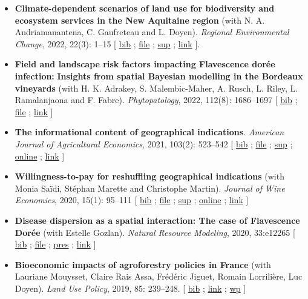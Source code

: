 \documentclass[11pt, a4paper]{./style}
\begin{document}
\begin{itemize}
\item \textbf{Climate-dependent scenarios of land use for biodiversity and
ecosystem services in the New Aquitaine region} (with
N. A. Andriamanantena, C. Gaufreteau and L. Doyen). \emph{Regional
Environmental Change}, 2022, 22(3): 1--15 [ \href{bib/MDFD.bib}{bib} ; \href{doc/CDSA-FILE.pdf}{file} ; \href{doc/CDSA-SUP.pdf}{sup} ;
\href{https://link.springer.com/article/10.1007/s10113-022-01964-6}{link} ].
\item \textbf{Field and landscape risk factors impacting Flavescence dorée
infection:} \textbf{Insights from spatial Bayesian modelling in the
Bordeaux vineyards} (with H. K. Adrakey, S. Malembic-Maher,
A. Rusch, L. Riley, L. Ramalanjaona and
F. Fabre). \emph{Phytopatology}, 2022, 112(8): 1686--1697 [ \href{bib/MDFD.bib}{bib} ; \href{doc/MDFD-FILE.pdf}{file}
; \href{https://apsjournals.apsnet.org/doi/10.1094/PHYTO-10-21-0449-R}{link} ]
\item \textbf{The informational content of geographical
indications}. \emph{American Journal of Agricultural Economics}, 2021,
103(2): 523--542 [ \href{bib/GEOIND.bib}{bib} ; \href{doc/GEOIND-FILE.pdf}{file} ; \href{doc/GEOIND-SUP.pdf}{sup} ; \href{https://github.com/jsay/geoInd/}{online} ; \href{https://onlinelibrary.wiley.com/doi/full/10.1111/ajae.12100}{link} ]
\item \textbf{Willingness-to-pay for reshuffling geographical indications}
(with Monia Saïdi, Stéphan Marette and Christophe
Martin). \emph{Journal of Wine Economics}, 2020, 15(1): 95--111 [ \href{bib/RFGI.bib}{bib}
; \href{doc/RFGI-FILE.pdf}{file} ; \href{doc/RFGI-SUP.pdf}{sup} ; \href{https://github.com/jsay/reshufGI/}{online} ; \href{https://www.cambridge.org/core/journals/journal-of-wine-economics/article/abs/willingnesstopay-for-reshuffling-geographical-indications/FD4DB1BCA54C1E204773BF861965BEBD}{link} ]
\item \textbf{Disease dispersion as a spatial interaction: The case of
Flavescence Dorée} (with Estelle Gozlan). \emph{Natural Resource
Modeling}, 2020, 33:e12265 [ \href{bib/SPFD.bib}{bib} ; \href{doc/SPFD-FILE.pdf}{file} ; \href{doc/SPFD-PRES.pdf}{pres} ; \href{https://onlinelibrary.wiley.com/doi/full/10.1111/nrm.12265}{link} ]
\item \textbf{Bioeconomic impacts of agroforestry policies in France} (with
Lauriane Mouysset, Claire Rais Assa, Frédéric Jiguet, Romain
Lorrilière, Luc Doyen). \emph{Land Use Policy}, 2019, 85: 239--248.  [
\href{bib/BIOFOR.bib}{bib} ; \href{https://www.sciencedirect.com/science/article/abs/pii/S0264837718308160}{link} ;  \href{http://cahiersdugretha.u-bordeaux4.fr/2017/2017-05.pdf}{wp} ]

\end{itemize}
\end{document}
